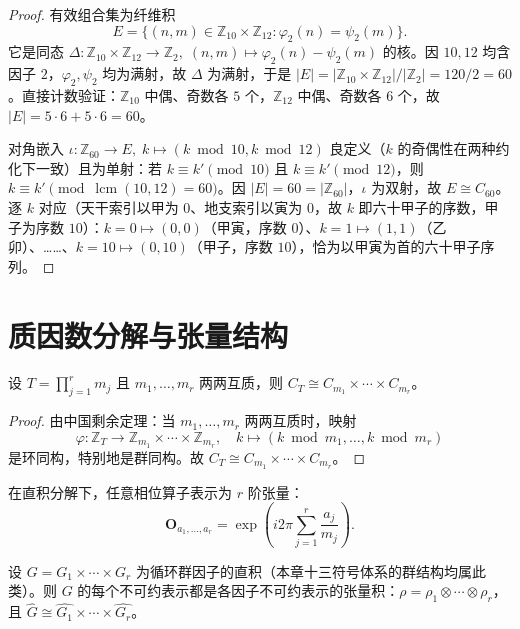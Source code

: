\begin{proof}
有效组合集为纤维积
\[
E = \{(n,m) \in \mathbb{Z}_{10} \times \mathbb{Z}_{12} : \varphi_2(n) = \psi_2(m)\}.
\]
它是同态 $\Delta: \mathbb{Z}_{10} \times \mathbb{Z}_{12} \to \mathbb{Z}_2,\; (n,m) \mapsto \varphi_2(n) - \psi_2(m)$ 的核。因 $10,12$ 均含因子 $2$，$\varphi_2,\psi_2$ 均为满射，故 $\Delta$ 为满射，于是 $|E| = |\mathbb{Z}_{10} \times \mathbb{Z}_{12}| / |\mathbb{Z}_2| = 120/2 = 60$。直接计数验证：$\mathbb{Z}_{10}$ 中偶、奇数各 $5$ 个，$\mathbb{Z}_{12}$ 中偶、奇数各 $6$ 个，故 $|E| = 5\cdot 6 + 5\cdot 6 = 60$。

对角嵌入 $\iota: \mathbb{Z}_{60} \to E,\; k \mapsto (k \bmod 10, k \bmod 12)$ 良定义（$k$ 的奇偶性在两种约化下一致）且为单射：若 $k \equiv k' \pmod{10}$ 且 $k \equiv k' \pmod{12}$，则 $k \equiv k' \pmod{\operatorname{lcm}(10,12) = 60}$。因 $|E| = 60 = |\mathbb{Z}_{60}|$，$\iota$ 为双射，故 $E \cong C_{60}$。逐 $k$ 对应（天干索引以甲为 $0$、地支索引以寅为 $0$，故 $k$ 即六十甲子的序数，甲子为序数 $10$）：$k=0 \mapsto (0,0)$（甲寅，序数 $0$）、$k=1 \mapsto (1,1)$（乙卯）、……、$k=10 \mapsto (0,10)$（甲子，序数 $10$），恰为以甲寅为首的六十甲子序列。
\end{proof}

\section{质因数分解与张量结构}

\begin{theorem}[循环群的直积分解]\label{thm:cyclic_direct_product_yijing}
设 $T = \prod_{j=1}^r m_j$ 且 $m_1, \dots, m_r$ 两两互质，则 $C_T \cong C_{m_1} \times \cdots \times C_{m_r}$。
\end{theorem}

\begin{proof}
由中国剩余定理：当 $m_1, \dots, m_r$ 两两互质时，映射
\[
\varphi: \mathbb{Z}_T \to \mathbb{Z}_{m_1} \times \cdots \times \mathbb{Z}_{m_r}, \quad k \mapsto (k \bmod m_1, \dots, k \bmod m_r)
\]
是环同构，特别地是群同构。故 $C_T \cong C_{m_1} \times \cdots \times C_{m_r}$。
\end{proof}

\begin{definition}[相位算子的张量表示]\label{def:tensor_representation_yijing}
在直积分解下，任意相位算子表示为 $r$ 阶张量：
\[
\mathbf{O}_{a_1,\dots,a_r} = \exp\left(i2\pi \sum_{j=1}^r \frac{a_j}{m_j}\right).
\]
\end{definition}

\begin{proposition}[不可约表示的张量积]\label{prop:irrep_tensor_product_yijing}
设 $G = G_1 \times \cdots \times G_r$ 为循环群因子的直积（本章十三符号体系的群结构均属此类）。则 $G$ 的每个不可约表示都是各因子不可约表示的张量积：$\rho = \rho_1 \otimes \cdots \otimes \rho_r$，且 $\widehat{G} \cong \widehat{G_1} \times \cdots \times \widehat{G_r}$。
\end{proposition}

